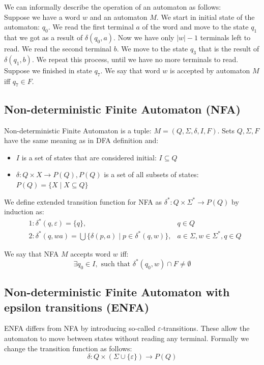 \documentclass{ctuthesis}
\begin{document}
We can informally describe the operation of an automaton as follows: \\
Suppose we have a word $w$ and an automaton $M$. We start in initial state of the automaton: $q_0$. We read the first terminal $a$ of the word and move to the state $q_1$ that we got as a result of $\delta(q_0, a)$. Now we have only $|w| - 1$ terminals left to read. We read the second terminal $b$. We move to the state $q_3$ that is the result of $\delta(q_1, b)$. We repeat this process, until we have no more terminals to read. Suppose we finished in state $q_7$. We say that word $w$ is accepted by automaton $M$ iff $q_7 \in F$.  

\subsection{Non-deterministic Finite Automaton (NFA)}
Non-deterministic Finite Automaton is a tuple: $M = (Q, \Sigma, \delta, I, F)$. Sets $Q, \Sigma, F$ have the same meaning as in DFA definition and: 
\begin{itemize}
	\item $I$ is a set of states that are considered initial: $I \subseteq Q$
	\item $\delta : Q \times X \rightarrow P(Q), P(Q)$ is a set of all subsets of states: $P(Q) = \{X \mid X \subseteq Q\}$
\end{itemize}

We define extended transition function for NFA as $\delta^* : Q \times \Sigma^* \rightarrow P(Q)$ by induction as:
\begin{align*}
	&1: \delta^*(q, \varepsilon) = \{q\}, &q \in Q \\
	&2: \delta^*(q, wa) = \bigcup\{\delta(p, a) \mid p \in \delta^*(q, w)\}, &a \in \Sigma, w \in \Sigma^*, q \in Q
\end{align*}

We say that NFA $M$ accepts word $w$ iff:
\begin{equation*}
	\exists q_0 \in I, \text{ such that } \delta^*(q_0, w) \cap F \ne \emptyset
\end{equation*}

\subsection{Non-deterministic Finite Automaton with epsilon transitions (ENFA)}
ENFA differs from NFA by introducing so-called $\varepsilon$-transitions. These allow the automaton to move between states without reading any terminal. Formally we change the transition function as follows:
\begin{equation*}
	\delta: Q \times (\Sigma \cup \{\varepsilon\}) \rightarrow P(Q)
\end{equation*}
\end{document}
